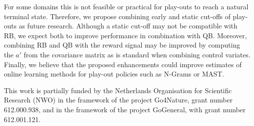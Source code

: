 \documentclass{ecai2014}
\begin{document}
For some domains this is not feasible or practical for play-outs to reach a natural terminal state. Therefore, we propose combining early and static cut-offs of play-outs as future research. Although a static cut-off may not be compatible with RB, we expect both to improve performance in combination with QB. Moreover, combining RB and QB with the reward signal may be improved by computing the $a'$ from the covariance matrix as is standard when combining control variates. 
Finally, we believe that the proposed enhancements could improve estimates of online learning methods for play-out policies such as N-Grams or MAST. %

\ack This work is partially funded by the Netherlands Organisation for Scientific Research (NWO) in the framework of the project Go4Nature, grant number 612.000.938, and in the framework of the project GoGeneral, with grant number 612.001.121.


\end{document}
